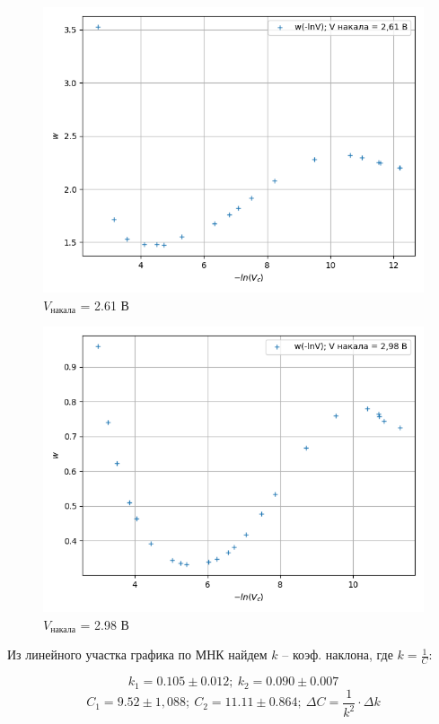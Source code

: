 \documentclass[a4paper, 12pt]{article}%
\begin{document}
\begin{enumerate}
\begin{figure}[!h]
\includegraphics[scale=0.6]{w_v_61.png}
\centering
\caption{$V_{\text{накала}}$ = 2.61 В}
\label{graph3}
\end{figure}

\begin{figure}[!h]
\includegraphics[scale=0.6]{w_v_98.png}
\centering
\caption{$V_{\text{накала}}$ = 2.98 В}
\label{graph4}
\end{figure}

Из линейного участка графика по МНК найдем $k$ -- коэф. наклона, $\text{где } k = \frac{1}{C}$:

$$ k_1 = 0.105 \pm 0.012;\ k_2 = 0.090 \pm 0.007$$
$$ C_1 = 9.52 \pm 1,088;\ C_2 = 11.11 \pm 0.864;\ \Delta C = \frac{1}{k^2}\cdot \Delta k$$


\end{enumerate}
\end{document}
